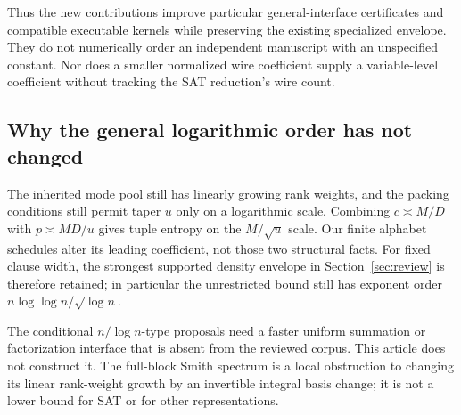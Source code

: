 Thus the new contributions improve particular general-interface certificates
and compatible executable kernels while preserving the existing specialized
envelope. They do not numerically order an independent manuscript with an
unspecified constant. Nor does a smaller normalized wire coefficient supply
a variable-level coefficient without tracking the SAT reduction's wire count.

\subsection{Why the general logarithmic order has not changed}
The inherited mode pool still has linearly growing rank weights, and the
packing conditions still permit taper $u$ only on a logarithmic scale.
Combining $c\asymp M/D$ with $p\asymp MD/u$ gives tuple entropy on the
$M/\sqrt u$ scale. Our finite alphabet schedules alter its leading coefficient,
not those two structural facts. For fixed clause width, the strongest
supported density envelope in Section~\ref{sec:review} is therefore retained;
in particular the unrestricted bound still has exponent order
$n\log\log n/\sqrt{\log n}$.

The conditional $n/\log n$-type proposals need a faster uniform summation or
factorization interface that is absent from the reviewed corpus. This article
does not construct it. The full-block Smith spectrum is a local obstruction
to changing its linear rank-weight growth by an invertible integral basis
change; it is not a lower bound for SAT or for other representations.

